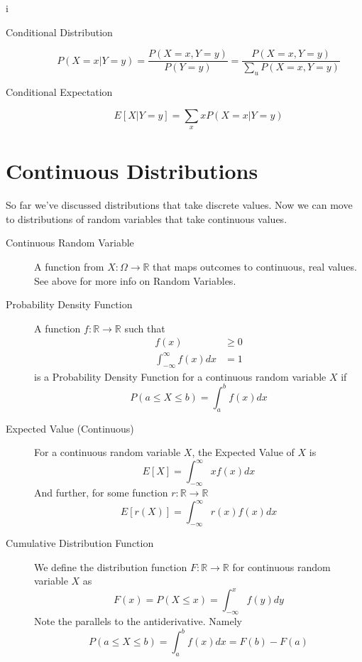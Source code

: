 i\documentclass[10pt]{article}
\begin{document}
\begin{description}
    \item[Conditional Distribution] 
        \[P(X = x | Y = y) = \frac{P(X = x, Y = y)}{P(Y = y)} = \frac{P(X = x, Y = y)}{\sum_u P(X = x, Y = y)} \]
    \item[Conditional Expectation] 
        \[E[X | Y = y] = \sum_x xP(X = x | Y = y) \]
\end{description}

\section{Continuous Distributions}

So far we've discussed distributions that take discrete values. Now we can move to distributions of random 
variables that take continuous values.

\begin{description}
    \item[Continuous Random Variable] A function from $X: \Omega \rightarrow \mathbb{R}$ that maps outcomes 
        to continuous, real values. See above for more info on Random Variables.
    \item[Probability Density Function] A function $f: \mathbb{R} \rightarrow \mathbb{R}$ such that 
        \begin{align*}
            f(x) &\geq 0 \\
            \int_{-\infty}^{\infty} f(x)dx &= 1
        \end{align*}
        is a Probability Density Function for a continuous random variable $X$ if
        \[ P(a \leq X \leq b) = \int_{a}^{b} f(x)dx \]
    \item[Expected Value (Continuous)] For a continuous random variable $X$, the Expected Value of $X$ is
        \[ E[X] = \int_{-\infty}^{\infty} xf(x)dx \]
        And further, for some function $r: \mathbb{R} \rightarrow \mathbb{R}$
        \[ E[r(X)] = \int_{-\infty}^{\infty} r(x)f(x)dx \]
    \item[Cumulative Distribution Function] We define the distribution function $F: \mathbb{R} \rightarrow \mathbb{R}$
        for continuous random variable $X$ as
        \[ F(x) = P(X \leq x) = \int_{-\infty}^{x} f(y)dy \] 
        Note the parallels to the antiderivative. Namely
        \[ P(a \leq X \leq b) = \int_{a}^{b} f(x)dx = F(b) - F(a) \]
\end{description}
\end{document}
